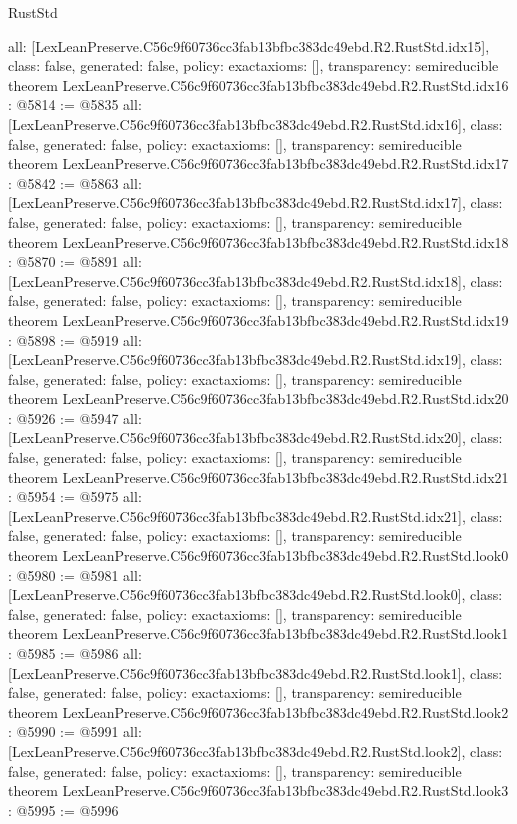 \begin{lexlean}{RustStd}
\begin{coremodule}
{  all: [LexLeanPreserve.C56c9f60736cc3fab13bfbc383dc49ebd.R2.RustStd.idx15],
  class: false,
  generated: false,
  policy: exact{axioms: []},
  transparency: semireducible
}
theorem LexLeanPreserve.C56c9f60736cc3fab13bfbc383dc49ebd.R2.RustStd.idx16 : @5814 := @5835 {
  all: [LexLeanPreserve.C56c9f60736cc3fab13bfbc383dc49ebd.R2.RustStd.idx16],
  class: false,
  generated: false,
  policy: exact{axioms: []},
  transparency: semireducible
}
theorem LexLeanPreserve.C56c9f60736cc3fab13bfbc383dc49ebd.R2.RustStd.idx17 : @5842 := @5863 {
  all: [LexLeanPreserve.C56c9f60736cc3fab13bfbc383dc49ebd.R2.RustStd.idx17],
  class: false,
  generated: false,
  policy: exact{axioms: []},
  transparency: semireducible
}
theorem LexLeanPreserve.C56c9f60736cc3fab13bfbc383dc49ebd.R2.RustStd.idx18 : @5870 := @5891 {
  all: [LexLeanPreserve.C56c9f60736cc3fab13bfbc383dc49ebd.R2.RustStd.idx18],
  class: false,
  generated: false,
  policy: exact{axioms: []},
  transparency: semireducible
}
theorem LexLeanPreserve.C56c9f60736cc3fab13bfbc383dc49ebd.R2.RustStd.idx19 : @5898 := @5919 {
  all: [LexLeanPreserve.C56c9f60736cc3fab13bfbc383dc49ebd.R2.RustStd.idx19],
  class: false,
  generated: false,
  policy: exact{axioms: []},
  transparency: semireducible
}
theorem LexLeanPreserve.C56c9f60736cc3fab13bfbc383dc49ebd.R2.RustStd.idx20 : @5926 := @5947 {
  all: [LexLeanPreserve.C56c9f60736cc3fab13bfbc383dc49ebd.R2.RustStd.idx20],
  class: false,
  generated: false,
  policy: exact{axioms: []},
  transparency: semireducible
}
theorem LexLeanPreserve.C56c9f60736cc3fab13bfbc383dc49ebd.R2.RustStd.idx21 : @5954 := @5975 {
  all: [LexLeanPreserve.C56c9f60736cc3fab13bfbc383dc49ebd.R2.RustStd.idx21],
  class: false,
  generated: false,
  policy: exact{axioms: []},
  transparency: semireducible
}
theorem LexLeanPreserve.C56c9f60736cc3fab13bfbc383dc49ebd.R2.RustStd.look0 : @5980 := @5981 {
  all: [LexLeanPreserve.C56c9f60736cc3fab13bfbc383dc49ebd.R2.RustStd.look0],
  class: false,
  generated: false,
  policy: exact{axioms: []},
  transparency: semireducible
}
theorem LexLeanPreserve.C56c9f60736cc3fab13bfbc383dc49ebd.R2.RustStd.look1 : @5985 := @5986 {
  all: [LexLeanPreserve.C56c9f60736cc3fab13bfbc383dc49ebd.R2.RustStd.look1],
  class: false,
  generated: false,
  policy: exact{axioms: []},
  transparency: semireducible
}
theorem LexLeanPreserve.C56c9f60736cc3fab13bfbc383dc49ebd.R2.RustStd.look2 : @5990 := @5991 {
  all: [LexLeanPreserve.C56c9f60736cc3fab13bfbc383dc49ebd.R2.RustStd.look2],
  class: false,
  generated: false,
  policy: exact{axioms: []},
  transparency: semireducible
}
theorem LexLeanPreserve.C56c9f60736cc3fab13bfbc383dc49ebd.R2.RustStd.look3 : @5995 := @5996 {
}
\end{coremodule}
\end{lexlean}
